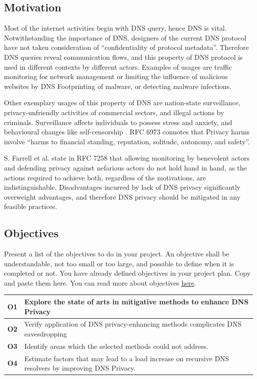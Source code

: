 \documentclass[a4paper,12pt]{article}
\begin{document}
\subsection{Motivation}
Most of the internet activities begin with DNS query, hence DNS is vital. Notwithstanding the importance of DNS, designers of the current DNS protocol have not taken consideration of ``confidentiality of protocol metadata''. Therefore DNS queries reveal communication flows, and this property of DNS protocol is used in different contexts by different actors. Examples of usages are traffic monitoring for network management or limiting the influence of malicious websites by DNS Footprinting of malware\cite{stoner2010dns}, or detecting malware infections\cite{lemos2013got}.

Other exemplary usages of this property of DNS are nation-state surveillance, privacy-unfriendly activities of commercial sectors\cite{weaver2011redirecting}, and illegal actions by criminals. Surveillance affects individuals to possess stress and anxiety\cite{oulasvirta2012long}, and behavioural changes like self-censorship \cite{rfc6973}. RFC 6973 connotes that Privacy harms involve ``harms to financial standing, reputation, solitude, autonomy, and safety\cite{rfc6973}''.

S. Farrell et al. state in RFC 7258 that allowing monitoring by benevolent actors and defending privacy against nefarious actors do not hold hand in hand, as the actions required to achieve both, regardless of the motivations, are indistinguishable\cite{rfc7258}.
Disadvantages incurred by lack of DNS privacy significantly overweight advantages, and therefore DNS privacy should be mitigated in any feasible practices.

\subsection{Objectives}
Present a list of the objectives to do in your project. An objective shall be understandable, not too small or too large, and possible to define when it is completed or not. You have already defined objectives in your project plan. Copy and paste them here. You can read more about objectives \href{https://coursepress.lnu.se/subject/thesis-projects/objectives/}{here}.\\

\begin{tabular} {|p{1.2cm}|p{11.6cm}|} \hline
    \textbf{O1} & Explore the state of arts in mitigative methods to enhance DNS Privacy \\ \hline
    \textbf{O2} & Verify application of DNS privacy-enhancing methods complicates DNS eavesdropping\\ \hline
    \textbf{O3} & Identify areas which the selected methods could not address. \\ \hline
    \textbf{O4} & Estimate factors that may lead to a load increase on recursive DNS resolvers by improving DNS Privacy.\\ \hline
\end{tabular}\\
\end{document}
